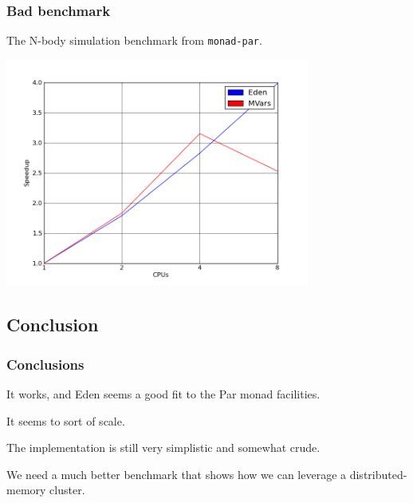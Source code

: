 \documentclass[12pt, danish]{beamer}
\begin{document}
\begin{frame}
\frametitle{Bad benchmark}

The N-body simulation benchmark from \texttt{monad-par}.

\includegraphics[width=10cm]{speedup.png}
\end{frame}

\subsection{Conclusion}

\begin{frame}
\frametitle{Conclusions}

It works, and Eden seems a good fit to the Par monad facilities.\pause

It seems to sort of scale.\pause

The implementation is still very simplistic and somewhat crude.\pause

We need a much better benchmark that shows how we can leverage a
distributed-memory cluster.

\end{frame}
\end{document}
